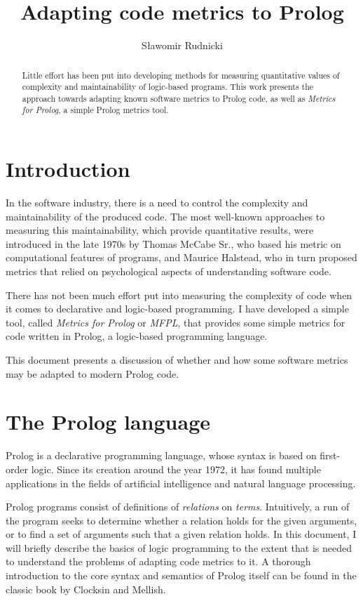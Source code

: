 \documentclass[11pt,a4paper,twoside]{article}
\author{Sławomir Rudnicki}
\title{Adapting code metrics to Prolog}
\date{}
\begin{document}
\maketitle
\begin{abstract}
  Little effort has been put into developing methods for measuring
  quantitative values of complexity and maintainability of logic-based
  programs. This work presents the approach towards adapting known
  software metrics to Prolog code, as well as \emph{Metrics for
    Prolog}, a simple Prolog metrics tool.
\end{abstract}
\begin{multicols}{2}

\section{Introduction}

In the software industry, there is a need to control the complexity
and maintainability of the produced code. The most well-known
approaches to measuring this maintainability, which provide
quantitative results, were introduced in the late 1970s by Thomas
McCabe Sr.\cite{mccabe}, who based his metric on computational
features of programs, and Maurice Halstead\cite{halstead}, who in
turn proposed metrics that relied on psychological aspects of
understanding software code.

There has not been much effort put into measuring the complexity of
code when it comes to declarative and logic-based programming. I have
developed a simple tool, called \emph{Metrics for Prolog} or
\emph{MFPL}, that provides some simple metrics for code written in
Prolog, a logic-based programming language. 

This document presents a discussion of whether and how some software
metrics may be adapted to modern Prolog code.

\section{The Prolog language}

Prolog is a declarative programming language, whose syntax is based on
first-order logic. Since its creation around the year 1972, it has
found multiple applications in the fields of artificial intelligence
and natural language processing.

Prolog programs consist of definitions of \emph{relations} on
\emph{terms}. Intuitively, a run of the program seeks to determine
whether a relation holds for the given arguments, or to find a set of
arguments such that a given relation holds. In this document, I will
briefly describe the basics of logic programming to the extent that is
needed to understand the problems of adapting code metrics to it. A
thorough introduction to the core syntax and semantics of Prolog
itself can be found in the classic book by Clocksin and
Mellish\cite{clocksin}.


\end{multicols}
\end{document}
